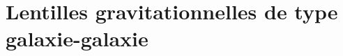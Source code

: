 

\section{Lentilles gravitationnelles de type galaxie-galaxie}\label{sec:lentilles gravitationnelles}


